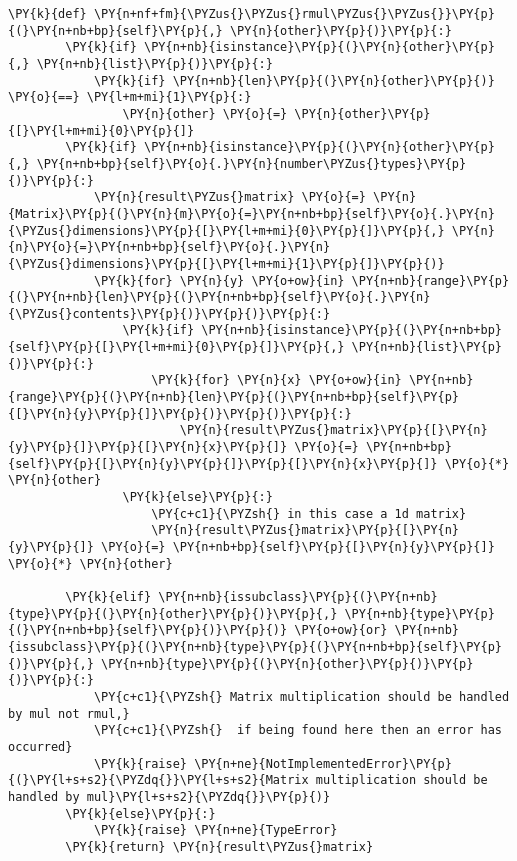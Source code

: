 \begin{Verbatim}[commandchars=\\\{\}]
    \PY{k}{def} \PY{n+nf+fm}{\PYZus{}\PYZus{}rmul\PYZus{}\PYZus{}}\PY{p}{(}\PY{n+nb+bp}{self}\PY{p}{,} \PY{n}{other}\PY{p}{)}\PY{p}{:}
        \PY{k}{if} \PY{n+nb}{isinstance}\PY{p}{(}\PY{n}{other}\PY{p}{,} \PY{n+nb}{list}\PY{p}{)}\PY{p}{:}
            \PY{k}{if} \PY{n+nb}{len}\PY{p}{(}\PY{n}{other}\PY{p}{)} \PY{o}{==} \PY{l+m+mi}{1}\PY{p}{:}
                \PY{n}{other} \PY{o}{=} \PY{n}{other}\PY{p}{[}\PY{l+m+mi}{0}\PY{p}{]}
        \PY{k}{if} \PY{n+nb}{isinstance}\PY{p}{(}\PY{n}{other}\PY{p}{,} \PY{n+nb+bp}{self}\PY{o}{.}\PY{n}{number\PYZus{}types}\PY{p}{)}\PY{p}{:}
            \PY{n}{result\PYZus{}matrix} \PY{o}{=} \PY{n}{Matrix}\PY{p}{(}\PY{n}{m}\PY{o}{=}\PY{n+nb+bp}{self}\PY{o}{.}\PY{n}{\PYZus{}dimensions}\PY{p}{[}\PY{l+m+mi}{0}\PY{p}{]}\PY{p}{,} \PY{n}{n}\PY{o}{=}\PY{n+nb+bp}{self}\PY{o}{.}\PY{n}{\PYZus{}dimensions}\PY{p}{[}\PY{l+m+mi}{1}\PY{p}{]}\PY{p}{)}
            \PY{k}{for} \PY{n}{y} \PY{o+ow}{in} \PY{n+nb}{range}\PY{p}{(}\PY{n+nb}{len}\PY{p}{(}\PY{n+nb+bp}{self}\PY{o}{.}\PY{n}{\PYZus{}contents}\PY{p}{)}\PY{p}{)}\PY{p}{:}
                \PY{k}{if} \PY{n+nb}{isinstance}\PY{p}{(}\PY{n+nb+bp}{self}\PY{p}{[}\PY{l+m+mi}{0}\PY{p}{]}\PY{p}{,} \PY{n+nb}{list}\PY{p}{)}\PY{p}{:}
                    \PY{k}{for} \PY{n}{x} \PY{o+ow}{in} \PY{n+nb}{range}\PY{p}{(}\PY{n+nb}{len}\PY{p}{(}\PY{n+nb+bp}{self}\PY{p}{[}\PY{n}{y}\PY{p}{]}\PY{p}{)}\PY{p}{)}\PY{p}{:}
                        \PY{n}{result\PYZus{}matrix}\PY{p}{[}\PY{n}{y}\PY{p}{]}\PY{p}{[}\PY{n}{x}\PY{p}{]} \PY{o}{=} \PY{n+nb+bp}{self}\PY{p}{[}\PY{n}{y}\PY{p}{]}\PY{p}{[}\PY{n}{x}\PY{p}{]} \PY{o}{*} \PY{n}{other}
                \PY{k}{else}\PY{p}{:}
                    \PY{c+c1}{\PYZsh{} in this case a 1d matrix}
                    \PY{n}{result\PYZus{}matrix}\PY{p}{[}\PY{n}{y}\PY{p}{]} \PY{o}{=} \PY{n+nb+bp}{self}\PY{p}{[}\PY{n}{y}\PY{p}{]} \PY{o}{*} \PY{n}{other}

        \PY{k}{elif} \PY{n+nb}{issubclass}\PY{p}{(}\PY{n+nb}{type}\PY{p}{(}\PY{n}{other}\PY{p}{)}\PY{p}{,} \PY{n+nb}{type}\PY{p}{(}\PY{n+nb+bp}{self}\PY{p}{)}\PY{p}{)} \PY{o+ow}{or} \PY{n+nb}{issubclass}\PY{p}{(}\PY{n+nb}{type}\PY{p}{(}\PY{n+nb+bp}{self}\PY{p}{)}\PY{p}{,} \PY{n+nb}{type}\PY{p}{(}\PY{n}{other}\PY{p}{)}\PY{p}{)}\PY{p}{:}
            \PY{c+c1}{\PYZsh{} Matrix multiplication should be handled by mul not rmul,}
            \PY{c+c1}{\PYZsh{}  if being found here then an error has occurred}
            \PY{k}{raise} \PY{n+ne}{NotImplementedError}\PY{p}{(}\PY{l+s+s2}{\PYZdq{}}\PY{l+s+s2}{Matrix multiplication should be handled by mul}\PY{l+s+s2}{\PYZdq{}}\PY{p}{)}
        \PY{k}{else}\PY{p}{:}
            \PY{k}{raise} \PY{n+ne}{TypeError}
        \PY{k}{return} \PY{n}{result\PYZus{}matrix}


\end{Verbatim}
